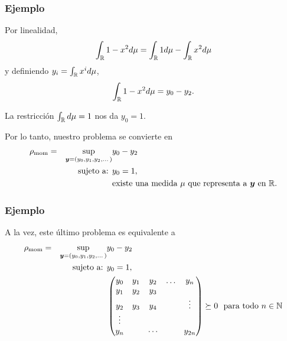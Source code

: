 \documentclass[aspectratio=169,12pt,spanish]{beamer}
\begin{document}

\begin{frame}

\frametitle{Ejemplo}

Por linealidad, 
$$
\int_{\mathbb{R}} 1 - x^2 d\mu = \int_{\mathbb{R}} 1 d\mu - \int_{\mathbb{R}} x^2 d\mu
$$
y definiendo $y_i = \int_{\mathbb{R}} x^i d\mu$, 
$$
\int_{\mathbb{R}} 1 - x^2 d\mu = y_0 - y_2.
$$

La restricción $\int_{\mathbb{R}} d\mu = 1$ nos da $y_0 = 1$.

Por lo tanto, nuestro problema se convierte en
\begin{alignat*}{2}
  \rho_{\text{mom}} = & & \sup_{\bm{y} = (y_0, y_1, y_2, \dots)} & y_0 - y_2   \\
   & & \text{sujeto a: } & y_0 = 1, \\
   &&& \text{existe una medida $\mu$ que representa a $\bm{y}$ en $\mathbb{R}$.}
\end{alignat*}


\end{frame}


\begin{frame}

\frametitle{Ejemplo}

A la vez, este último problema es equivalente a 
\begin{alignat*}{2}
  \rho_{\text{mom}} = & & \sup_{\bm{y} = (y_0, y_1, y_2, \dots)} & y_0 - y_2   \\
   & & \text{sujeto a: } & y_0 = 1, \\
   &&& \begin{pmatrix} 
   y_0 & y_1 & y_2 & \dots & y_n\\
   y_1 & y_2 & y_3 & &  \\
   y_2 & y_3 & y_4 & &\vdots \\
   \vdots & &  &  & \\
   y_n & & \cdots &  & y_{2n}
   \end{pmatrix} \succeq 0 \ \text{ para todo } n \in \mathbb{N}
\end{alignat*}



\end{frame}

\end{document}
